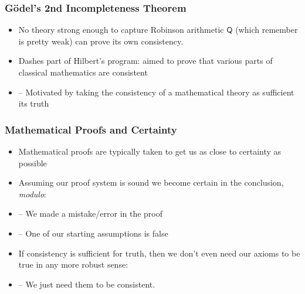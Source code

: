 \begin{frame}
\frametitle{G\"odel's 2nd Incompleteness Theorem}

\begin{itemize}[<+->]

\item No theory strong enough to capture Robinson arithmetic $\mathsf{Q}$ (which remember is pretty weak) can prove its own consistency.

\item Dashes part of Hilbert's program: aimed to prove that various parts of classical mathematics are consistent

\item[] -- Motivated by taking the consistency of a mathematical theory as sufficient its truth





\end{itemize}
\end{frame}

\begin{frame}
\frametitle{Mathematical Proofs and Certainty}

\begin{itemize}[<+->]

\item Mathematical proofs are typically taken to get us as close to certainty as possible

\item Assuming our proof system is sound we become certain in the conclusion, \textit{modulo}:
\item[] -- We made a mistake/error in the proof
\item[] -- One of our starting assumptions is false

\item If consistency is sufficient for truth, then we don't even need our axioms to be true in any more robust sense: 
\item[] -- We just need them to be consistent. 

\end{itemize}
\end{frame}

